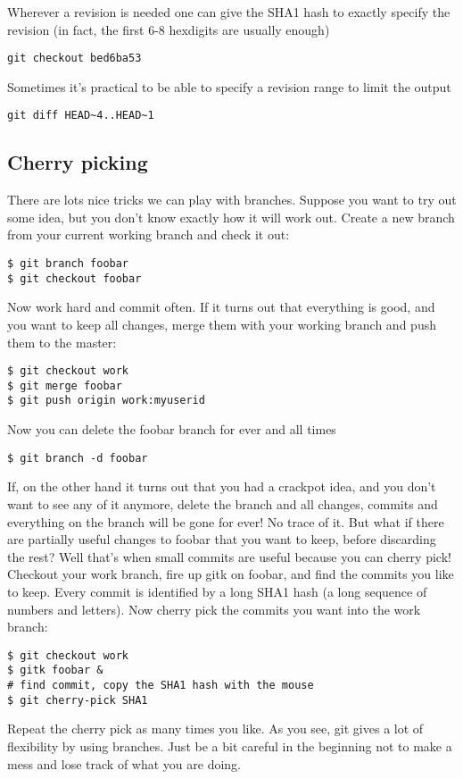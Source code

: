 \documentclass[a4paper,10pt]{article}
\begin{document}
Wherever a revision is needed one can give
the SHA1 hash to exactly specify the revision (in fact, the first 6-8
hexdigits are usually enough)
\begin{verbatim}
git checkout bed6ba53
\end{verbatim}

Sometimes it's practical to be able to specify a revision range to limit the
output
\begin{verbatim}
git diff HEAD~4..HEAD~1
\end{verbatim}

\subsection{Cherry picking}
\label{sec:cherry}
There are lots nice tricks we can play with
branches. Suppose you want to try out some idea, but you don't know exactly
how it will work out. Create a new branch from your current working branch and
check it out:
\begin{verbatim}
$ git branch foobar
$ git checkout foobar
\end{verbatim}
Now work hard and commit often. If it turns out that everything is good, and
you want to keep all changes, merge them with your working branch and push
them to the master:
\begin{verbatim}
$ git checkout work
$ git merge foobar
$ git push origin work:myuserid
\end{verbatim}
Now you can delete the foobar branch for ever and all times
\begin{verbatim}
$ git branch -d foobar
\end{verbatim}
If, on the other hand it turns out that you had a crackpot idea, and you
don't want to see any of it anymore, delete the branch and all changes,
commits and everything on the branch will be gone for ever! No trace of it.
But what if there are partially useful changes to foobar that you want to
keep, before discarding the rest? Well that's when small commits are useful
because you can cherry pick! Checkout your work branch, fire up gitk on foobar,
and find the commits you like to keep. Every commit is identified by a long
SHA1 hash (a long sequence of numbers and letters). Now cherry pick the
commits you want into the work branch:
\begin{verbatim}
$ git checkout work
$ gitk foobar &
# find commit, copy the SHA1 hash with the mouse
$ git cherry-pick SHA1
\end{verbatim}
Repeat the cherry pick as many times you like. As you see, git gives a lot of
flexibility by using branches. Just be a bit careful in the beginning not to
make a mess and lose track of what you are doing. 
\end{document}
